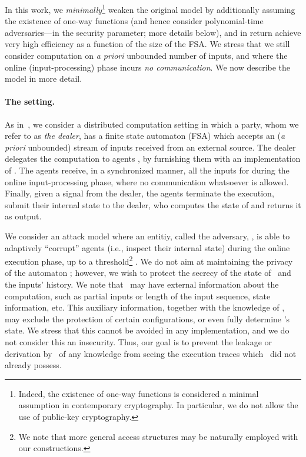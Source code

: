 \documentclass[letterpaper,11pt]{article}
\newcommand{\Ad}{}
\newcommand{\A}{}
\begin{document}
In this work, we {\em minimally}\footnote{Indeed, the existence
of one-way functions is considered a minimal assumption in contemporary
cryptography. In particular, we do not allow the use of public-key 
cryptography.}
weaken the original model by
additionally assuming the existence of one-way functions (and hence
consider polynomial-time adversaries---in the security parameter; more
details below), and in return achieve very high efficiency as a
function of the size of the FSA.  We stress that we still consider
computation on {\em a priori} unbounded number of inputs, and
where the online (input-processing) phase incurs {\em no communication}.
We now describe the model in more detail.


\vspace{-.1in}
\paragraph{The setting.}
As in~\cite{DGGK11}, we consider a distributed computation setting in
which a party, whom we refer to as {\it the dealer}, has a finite
state automaton (FSA)  which accepts an ({\em a priori}
unbounded) stream of inputs  received from an
external source. The dealer delegates the computation to agents
, by furnishing them with an implementation of \A.
The agents receive, in a synchronized manner, all
the inputs for  during the online input-processing phase,
where no communication whatsoever is allowed.  Finally, given a signal
from the dealer, the agents terminate the execution, submit their 
 internal state to the dealer, who computes the  state of   and returns it as output.

We consider an attack model where an entitiy,
called the adversary, \Ad, is able to adaptively ``corrupt'' agents
(i.e., inspect their internal state) during the online execution
phase, up to a threshold\footnote{We note that more general access 
structures may be naturally employed with our constructions.} 
.  We do not aim at maintaining the privacy of the
automaton \A; however, we wish to protect the secrecy of the state of
\A\ and the inputs' history.  We note that \Ad\ may have external
information about the computation, such as partial inputs or length of
the input sequence, state information, etc.  This auxiliary
information, together with the knowledge of \A, may exclude the
protection of certain configurations, or even fully determine \A's
state.  We stress that this cannot be avoided in any implementation,
and we do not consider this an insecurity.  Thus, our goal is to
prevent the leakage or derivation by
\Ad\ of any knowledge from seeing the execution traces which \Ad\ did
not already possess.
\end{document}
